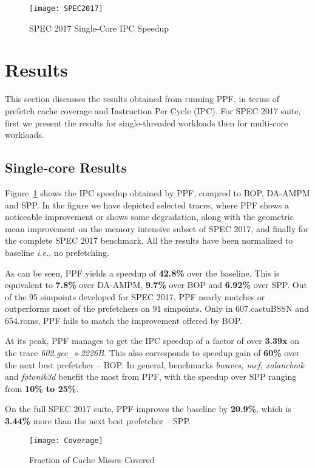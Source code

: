 \begin{figure}[h]
\texttt{[image: SPEC2017]}
\caption{SPEC 2017 Single-Core IPC Speedup}
\label{Fig:SPEC2017_1core}
\end{figure}

\section{Results}
\label{Results}

This section discusses the results obtained from running PPF, in
terms of prefetch cache coverage and Instruction Per
Cycle (IPC).  For SPEC 2017 suite, first we present the
results for single-threaded workloads then for multi-core
workloads.

\subsection{Single-core Results}
\label{Results-Single}


Figure~\ref{Fig:SPEC2017_1core} shows the IPC speedup obtained by
PPF, compred to BOP, DA-AMPM and SPP. 
In the figure we have depicted selected traces, where PPF shows a 
noticeable improvement or shows some degradation, along with the 
geometric mean improvement on the memory intensive subset of SPEC 2017, 
and finally for the complete SPEC 2017 benchmark. 
All the results have been normalized to baseline \textit{i.e.}, no
prefetching.  

As can be seen, PPF yields a speedup of \textbf{42.8\%} over
the baseline. This is equivalent to \textbf{7.8\%} over DA-AMPM, \textbf{9.7\%} over BOP
and \textbf{6.92\%} over SPP.  Out of the 95 simpoints developed for SPEC 2017, 
PPF nearly matches or outperforms most of the prefetchers on 91 simpoints.
Only in 607.cactuBSSN and 654.roms, PPF fails to match the improvement 
offered by BOP.

At its peak, PPF manages to get the IPC speedup of a factor of
over \textbf{3.39x} on the trace \textit{602.gcc\_s-2226B}.  This also
corresponds to speedup gain of \textbf{60\%} over the next best
prefetcher -- BOP. 
In general, benchmarks \textit{bwaves, mcf, xalancbmk} 
and \textit{fotonik3d} benefit the most from PPF, with the speedup over
SPP ranging from \textbf{10\% to 25\%}.

On the full SPEC 2017 suite, PPF improves the baseline by \textbf{20.9\%},
which is \textbf{3.44\%} more than the next best prefetcher -- SPP.

\begin{figure}[h]
\texttt{[image: Coverage]}
\caption{Fraction of Cache Misses Covered}
\label{Fig:Coverage}
\end{figure}

